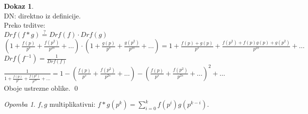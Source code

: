 \documentclass[a4paper, 12pt]{book}
\theoremstyle{definition}
\newtheorem{pro}[counter]{Dokaz}
\theoremstyle{remark}
\newtheorem*{rem}{Opomba}
\begin{document}
\begin{pro} \text{} \\
  DN: direktno iz definicije. \\
  Preko trditve: \\
  $Drf(f * g) \stackrel{?}{=} Drf(f) \cdot Drf(g)$ \\
  $\left(1 + \frac{f(p)}{p^s} + \frac{f(p^2)}{p^{2s}} + \dots \right) \cdot
  \left(1 + \frac{g(p)}{p^s} + \frac{g(p^2)}{p^{2s}} + \dots \right) =
  1 + \frac{f(p) + g(p)}{p^{s}} + \frac{f(p^2) + f(p) g(p) + g(p^2)}{p^{2s}} + \dots$ \\
  $Drf(f^{-1}) = \frac{1}{Drf(f)}$ \\
  $\frac{1}{1 + \frac{f(p)}{p^s} + \frac{f(p^2)}{p^{2s}} + \dots} =
  1 - \left(\frac{f(p)}{p^s} + \frac{f(p^2)}{p^{2s}} + \dots\right) -
  \left(\frac{f(p)}{p^s} + \frac{f(p^2)}{p^{2s}} + \dots\right)^2 + \dots$ \\
  Oboje ustrezne oblike.
  \qed
\end{pro}
\begin{rem}
  $f, g$ multiplikativni: $f * g\left(p^k\right) = \sum_{i=0}^{k} f\left(p^i\right) g\left(p^{k-i}\right)$.
\end{rem}
\end{document}
